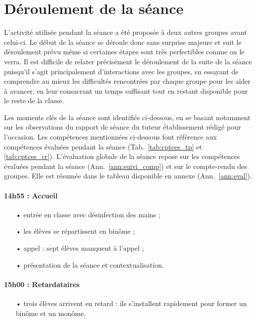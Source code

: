 \documentclass[12pt,a4paper, fleqn]{report}
\begin{document}
\section{Déroulement de la séance}

L'activité utilisée pendant la séance a été proposée à deux autres groupes avant celui-ci.
Le début de la séance se déroule donc sans surprise majeure et suit le déroulement prévu même si certaines étapes sont très perfectibles comme on le verra.
Il est difficile de relater précisément le déroulement de la suite de la séance puisqu'il s'agit principalement  d'interactions avec les groupes, en essayant de comprendre au mieux les difficultés rencontrées par chaque groupe pour les aider à avancer, en leur consacrant un temps suffisant tout en restant disponible pour le reste de la classe.

Les moments clés de la séance sont identifiés ci-dessous, en se basant notamment sur les observations du rapport de séance du tuteur établissement rédigé pour l'occasion.
Les compétences mentionnées ci-dessous font référence aux compétences évaluées pendant la séance (Tab.~\ref{tab:cptces_tp} et \ref{tab:cptces_cr}).
L'évaluation globale de la séance repose sur les compétences évaluées pendant la séance (Ann.~\ref{ann:suivi_comp}) et sur le compte-rendu des groupes.
Elle est résumée dans le tableau disponible en annexe (Ann.~\ref{ann:eval}).

\paragraph{14h55 : Accueil}
\begin{itemize}
\item[•] entrée en classe avec désinfection des mains ;
\item[•] les élèves se répartissent en binôme ;
\item[•] appel : sept élèves manquent à l'appel ;
\item[•] présentation de la séance et contextualisation.
\end{itemize}

\paragraph{15h00 : Retardataires}
\begin{itemize}
\item[•] trois élèves arrivent en retard : ils s'installent rapidement pour former un binôme et un monôme.
\end{itemize}
\end{document}
